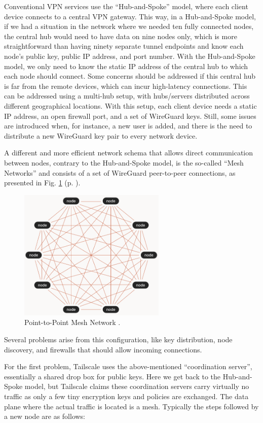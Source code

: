 Conventional VPN services use the ``Hub-and-Spoke'' model, where each client device connects to a central VPN gateway. This way, in a Hub-and-Spoke model, if we had a situation in the network where we needed ten fully connected nodes, the central hub would need to have data on nine nodes only, which is more straightforward than having ninety separate tunnel endpoints and know each node's public key, public IP address, and port number. With the Hub-and-Spoke model, we only need to know the static IP address of the central hub to which each node should connect. Some concerns should be addressed if this central hub is far from the remote devices, which can incur high-latency connections. This can be addressed using a multi-hub setup, with hubs/servers distributed across different geographical locations. With this setup, each client device needs a static IP address, an open firewall port, and a set of WireGuard keys. Still, some issues are introduced when, for instance, a new user is added, and there is the need to distribute a new WireGuard key pair to every network device.

A different and more efficient network schema that allows direct communication between nodes, contrary to the Hub-and-Spoke model, is the so-called ``Mesh Networks'' and consists of a set of WireGuard peer-to-peer connections, as presented in Fig. \ref{fig:tailscale_mesh} (p. \pageref{fig:tailscale_mesh}).

\begin{figure}[H]
    \includegraphics[width=7cm]{figures/tailscale_meshnetwork.png}
    \caption{Point-to-Point Mesh Network \cite{tailscale_docs_ref}.}
    \label{fig:tailscale_mesh}
\end{figure}

Several problems arise from this configuration, like key distribution, node discovery, and firewalls that should allow incoming connections.

For the first problem, Tailscale uses the above-mentioned ``coordination server'', essentially a shared drop box for public keys. Here we get back to the Hub-and-Spoke model, but Tailscale claims these coordination servers carry virtually no traffic as only a few tiny encryption keys and policies are exchanged. The data plane where the actual traffic is located is a mesh. Typically the steps followed by a new node are as follows:

